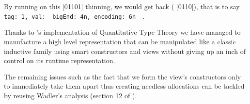 By running  on this [01101] thinning, we would get
back ( [0110]), that is to say
\texttt{{ tag: 1, val: { bigEnd: 4n, encoding: 6n } }}.

Thanks to \idris{}'s implementation of Quantitative Type Theory we have managed
to manufacture a high level representation that can be manipulated like a classic
inductive family using smart constructors and views without giving up an inch of
control on its runtime representation.

The remaining issues such as the fact that we form the view's constructors only
to immediately take them apart thus creating needless allocations can be tackled
by reusing Wadler's analysis (section 12 of \cite{DBLP:conf/popl/Wadler87}).
